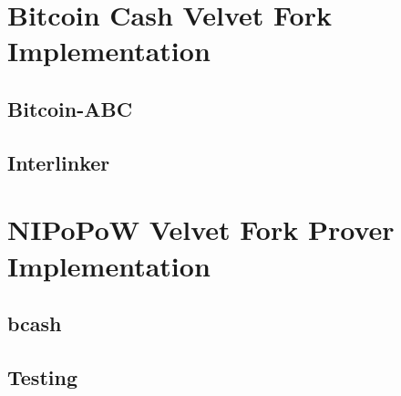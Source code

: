 \documentclass[11pt]{llncs}
\begin{document}
\section{Bitcoin Cash Velvet Fork Implementation}

\subsection{Bitcoin-ABC}
\subsection{Interlinker}

\section{NIPoPoW Velvet Fork Prover Implementation}

\subsection{bcash}
\subsection{Testing}


\end{document}

